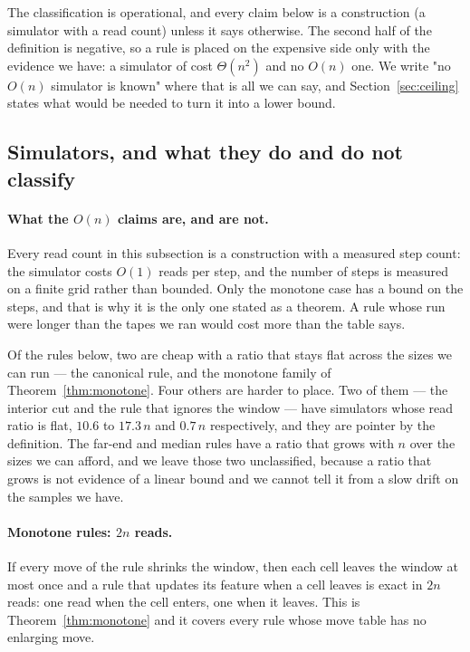 \documentclass[11pt]{article}
\begin{document}
The classification is operational, and every claim below is a construction (a simulator with a read
count) unless it says otherwise. The second half of the definition is negative, so a rule is placed
on the expensive side only with the evidence we have: a simulator of cost $\Theta(n^2)$ and no
$O(n)$ one. We write "no $O(n)$ simulator is known" where that is all we can say, and
Section~\ref{sec:ceiling} states what would be needed to turn it into a lower bound.

\subsection{Simulators, and what they do and do not classify}
\label{sec:sims}

\paragraph{What the $O(n)$ claims are, and are not.} Every read count in this subsection is a
construction with a measured step count: the simulator costs $O(1)$ reads per step, and the number
of steps is measured on a finite grid rather than bounded. Only the monotone case has a bound on
the steps, and that is why it is the only one stated as a theorem. A rule whose run were longer
than the tapes we ran would cost more than the table says.

Of the rules below, two are cheap with a ratio that stays flat across the sizes we can run --- the
canonical rule, and the monotone family of Theorem~\ref{thm:monotone}. Four others are harder to place. Two of
them --- the interior cut and the rule that ignores the window --- have simulators whose read ratio is
flat, $10.6$ to $17.3\,n$ and $0.7\,n$ respectively, and they are pointer by the definition. The
far-end and median rules have a ratio that grows with $n$ over the sizes we can afford, and we leave
those two unclassified, because a ratio that grows is not evidence of a linear bound and we cannot
tell it from a slow drift on the samples we have.

\paragraph{Monotone rules: $2n$ reads.} If every move of the rule shrinks the window, then each cell
leaves the window at most once and a rule that updates its feature when a cell leaves is exact in $2n$
reads: one read when the cell enters, one when it leaves. This is Theorem~\ref{thm:monotone} and it
covers every rule whose move table has no enlarging move.
\end{document}
